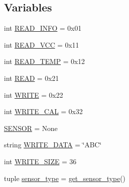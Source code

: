 \subsection*{Variables}
\begin{DoxyCompactItemize}
\item 
int \hyperlink{namespacetest_ae3d92ee5a9adc4f30b4dbe11ddb40a21}{R\-E\-A\-D\-\_\-\-I\-N\-F\-O} = 0x01
\item 
int \hyperlink{namespacetest_a44e5ad39f0c147a2e71624be56e99d95}{R\-E\-A\-D\-\_\-\-V\-C\-C} = 0x11
\item 
int \hyperlink{namespacetest_a79f4ea0acd6b49713be24560c2a71f6a}{R\-E\-A\-D\-\_\-\-T\-E\-M\-P} = 0x12
\item 
int \hyperlink{namespacetest_a2ce8a5c40c782312e4064330f10e3703}{R\-E\-A\-D} = 0x21
\item 
int \hyperlink{namespacetest_ac2d4de6ac2d32927ec95407a12368ea4}{W\-R\-I\-T\-E} = 0x22
\item 
int \hyperlink{namespacetest_ad426fa2987715f1e3e91b16989000b52}{W\-R\-I\-T\-E\-\_\-\-C\-A\-L} = 0x32
\item 
\hyperlink{namespacetest_a2391ebb4e984e0aa09635f75c5d04c0c}{S\-E\-N\-S\-O\-R} = None
\item 
string \hyperlink{namespacetest_a8f2c78b1eb0ea3d8311cb713bed20e23}{W\-R\-I\-T\-E\-\_\-\-D\-A\-T\-A} = \char`\"{}A\-B\-C\char`\"{}
\item 
int \hyperlink{namespacetest_a6add39dbd057796c95a558ef27df7f91}{W\-R\-I\-T\-E\-\_\-\-S\-I\-Z\-E} = 36
\item 
tuple \hyperlink{namespacetest_a91abf77ee3cdf450b2ff3282338cadff}{sensor\-\_\-type} = \hyperlink{namespacetest_a723a5231a237d79a789f4ad357e7d6e0}{get\-\_\-sensor\-\_\-type}()
\end{DoxyCompactItemize}


